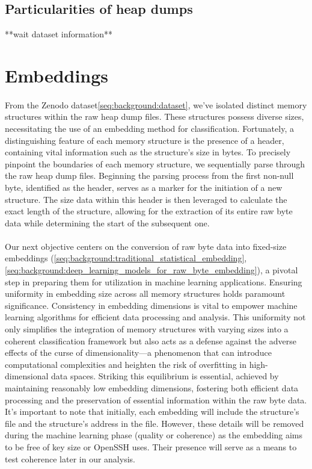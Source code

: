         \subsection{Particularities of heap dumps}
            **wait dataset information**

        
    \section{Embeddings}
        \paragraph{}From the Zenodo dataset\ref{seq:background:dataset}, we've isolated distinct memory structures within the raw heap dump files. These structures possess diverse sizes, necessitating the use of an embedding method for classification. Fortunately, a distinguishing feature of each memory structure is the presence of a header, containing vital information such as the structure's size in bytes. To precisely pinpoint the boundaries of each memory structure, we sequentially parse through the raw heap dump files. Beginning the parsing process from the first non-null byte, identified as the header, serves as a marker for the initiation of a new structure. The size data within this header is then leveraged to calculate the exact length of the structure, allowing for the extraction of its entire raw byte data while determining the start of the subsequent one.
        
        \paragraph{}Our next objective centers on the conversion of raw byte data into fixed-size embeddings (\ref{seq:background:traditional_statistical_embedding}, \ref{seq:background:deep_learning_models_for_raw_byte_embedding}), a pivotal step in preparing them for utilization in machine learning applications. Ensuring uniformity in embedding size across all memory structures holds paramount significance. Consistency in embedding dimensions is vital to empower machine learning algorithms for efficient data processing and analysis. This uniformity not only simplifies the integration of memory structures with varying sizes into a coherent classification framework but also acts as a defense against the adverse effects of the curse of dimensionality—a phenomenon that can introduce computational complexities and heighten the risk of overfitting in high-dimensional data spaces. Striking this equilibrium is essential, achieved by maintaining reasonably low embedding dimensions, fostering both efficient data processing and the preservation of essential information within the raw byte data. It's important to note that initially, each embedding will include the structure's file and the structure's address in the file. However, these details will be removed during the machine learning phase (quality or coherence) as the embedding aims to be free of key size or OpenSSH uses. Their presence will serve as a means to test coherence later in our analysis.

